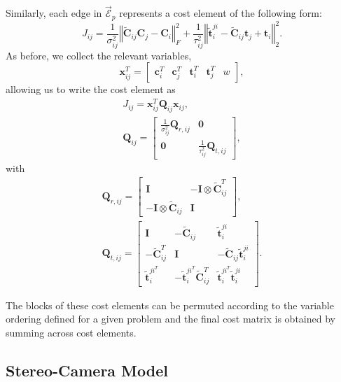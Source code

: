 \documentclass[lettersize,journal]{IEEEtran}
\newcommand{\EdgeSet}{\vec{\bm{\mathcal{E}}}}
\begin{document}
{Similarly, each edge in $\EdgeSet_p$ represents a cost element of the following form:
\begin{equation}
	J_{ij} = \frac{1}{\sigma^2_{ij}} \left\Vert \tilde{\bm{C}}_{ij}\bm{C}_j - \bm{C}_i\right\Vert_F^2 + \frac{1}{\tau^2_{ij}} \left\Vert \tilde{\bm{t}}^{ji}_{i} - \tilde{\bm{C}}_{ij}\bm{t}_j + \bm{t}_i \right\Vert_2^2.
\end{equation}
As before, we collect the relevant variables,
\begin{equation*}
	\bm{x}_{ij}^T = \begin{bmatrix} \bm{c}_i^T&\bm{c}_j^T  & \bm{t}_i^T & \bm{t}_j^T & w\end{bmatrix},
\end{equation*}
allowing us to write the cost element as
\begin{gather*}
	J_{ij}= \bm{x}_{ij}^T\bm{Q}_{ij}\bm{x}_{ij}, \\
	\bm{Q}_{ij} = \begin{bmatrix}
		\frac{1}{\sigma^2_{ij}}\bm{Q}_{r,ij} & \bm{0}\\
		\bm{0}&\frac{1}{\tau^2_{ij}}\bm{Q}_{t,ij}
	\end{bmatrix},
\end{gather*}
with
\begin{gather*}
	\bm{Q}_{r,ij}=\begin{bmatrix}
		\bm{I}  &  -\bm{I}\otimes\tilde{\bm{C}}_{ij}^T\\
		-\bm{I}\otimes\tilde{\bm{C}}_{ij} & \bm{I}
	\end{bmatrix}, \\ 
	\bm{Q}_{t,ij}=\begin{bmatrix}
		\bm{I}  &  -\tilde{\bm{C}}_{ij} & \tilde{\bm{t}}_{i}^{ji}\\
		-\tilde{\bm{C}}_{ij}^T & \bm{I} & -\tilde{\bm{C}}_{ij}\tilde{\bm{t}}_{i}^{ji}\\
		\tilde{\bm{t}}_{i}^{ji^T} &  -\tilde{\bm{t}}_{i}^{ji^T}\tilde{\bm{C}}_{ij}^T & \tilde{\bm{t}}_{i}^{ji^T} \tilde{\bm{t}}_{i}^{ji}
	\end{bmatrix}.
\end{gather*}

The blocks of these cost elements can be permuted according to the variable ordering defined for a given problem and the final cost matrix is obtained by summing across cost elements.
}


\subsection{Stereo-Camera Model}\label{SM:stereo}
\end{document}
